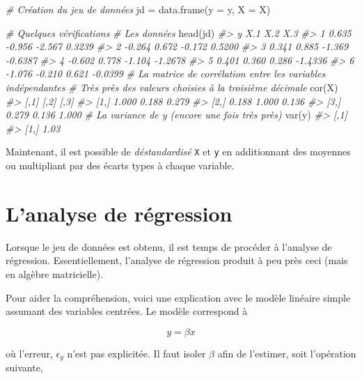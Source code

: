 \documentclass[
]{book}
\newenvironment{Shaded}{}{}
\newcommand{\AttributeTok}[1]{#1}
\newcommand{\CommentTok}[1]{\textit{#1}}
\newcommand{\FunctionTok}[1]{#1}
\newcommand{\NormalTok}[1]{#1}
\newcommand{\OtherTok}[1]{#1}
\begin{document}
\begin{Shaded}
\begin{Highlighting}[]
\CommentTok{\# Création du jeu de données}
\NormalTok{jd }\OtherTok{=} \FunctionTok{data.frame}\NormalTok{(}\AttributeTok{y =}\NormalTok{ y, }\AttributeTok{X =}\NormalTok{ X)}

\CommentTok{\# Quelques vérifications}
\CommentTok{\# Les données}
\FunctionTok{head}\NormalTok{(jd)}
\CommentTok{\#\textgreater{}        y    X.1    X.2     X.3}
\CommentTok{\#\textgreater{} 1  0.635 {-}0.956 {-}2.567  0.3239}
\CommentTok{\#\textgreater{} 2 {-}0.264  0.672 {-}0.172  0.5200}
\CommentTok{\#\textgreater{} 3  0.341  0.885 {-}1.369 {-}0.6387}
\CommentTok{\#\textgreater{} 4 {-}0.602  0.778 {-}1.104 {-}1.2678}
\CommentTok{\#\textgreater{} 5  0.401  0.360  0.286 {-}1.4336}
\CommentTok{\#\textgreater{} 6 {-}1.076 {-}0.210  0.621 {-}0.0399}
\CommentTok{\# La matrice de corrélation entre les variables indépendantes}
\CommentTok{\# Très près des valeurs choisies à la troisième décimale}
\FunctionTok{cor}\NormalTok{(X)}
\CommentTok{\#\textgreater{}       [,1]  [,2]  [,3]}
\CommentTok{\#\textgreater{} [1,] 1.000 0.188 0.279}
\CommentTok{\#\textgreater{} [2,] 0.188 1.000 0.136}
\CommentTok{\#\textgreater{} [3,] 0.279 0.136 1.000}
\CommentTok{\# La variance de y (encore une fois très près)}
\FunctionTok{var}\NormalTok{(y)}
\CommentTok{\#\textgreater{}      [,1]}
\CommentTok{\#\textgreater{} [1,] 1.03}
\end{Highlighting}
\end{Shaded}

Maintenant, il est possible de \emph{déstandardisé} \texttt{X} et \texttt{y} en additionnant des moyennes ou multipliant par des écarts types à chaque variable.

\hypertarget{lanalyse-de-ruxe9gression}{%
\section{L'analyse de régression}\label{lanalyse-de-ruxe9gression}}

Lorsque le jeu de données est obtenu, il est temps de procéder à l'analyse de régression. Essentiellement, l'analyse de régression produit à peu près ceci (mais en algèbre matricielle).

Pour aider la compréhension, voici une explication avec le modèle linéaire simple assumant des variables centrées. Le modèle correspond à

\[
y = \beta x
\]

où l'erreur, \(\epsilon_y\) n'est pas explicitée. Il faut isoler \(\beta\) afin de l'estimer, soit l'opération suivante,
\end{document}
